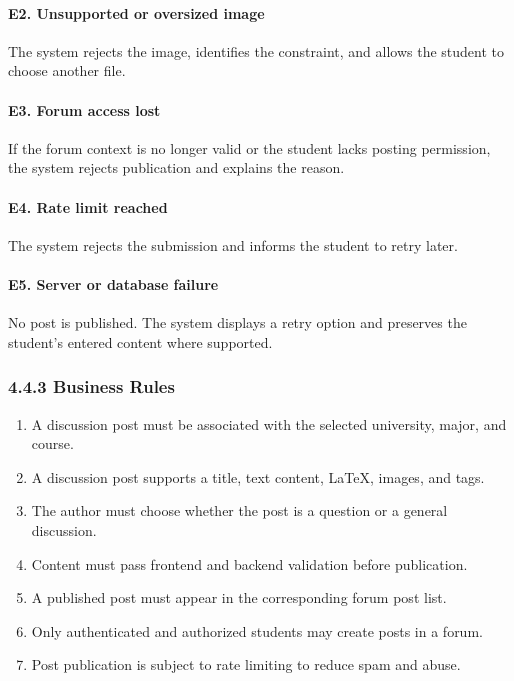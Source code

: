 \documentclass[12pt]{article}
\begin{document}
\paragraph*{E2. Unsupported or oversized image}
\par\medskip
The system rejects the image, identifies the constraint, and allows the student to choose another file.
\par\medskip
\hypertarget{sec:e3-forum-access-lost}{}
\paragraph*{E3. Forum access lost}
\par\medskip
If the forum context is no longer valid or the student lacks posting permission, the system rejects publication and explains the reason.
\par\medskip
\hypertarget{sec:e4-rate-limit-reached}{}
\paragraph*{E4. Rate limit reached}
\par\medskip
The system rejects the submission and informs the student to retry later.
\par\medskip
\hypertarget{sec:e5-server-or-database-failure}{}
\paragraph*{E5. Server or database failure}
\par\medskip
No post is published. The system displays a retry option and preserves the student's entered content where supported.
\par\medskip
\hypertarget{sec:4-4-3-business-rules}{}
\subsubsection*{4.4.3 Business Rules}
\par\medskip
\begin{enumerate}
\item A discussion post must be associated with the selected university, major, and course.
\item A discussion post supports a title, text content, LaTeX, images, and tags.
\item The author must choose whether the post is a question or a general discussion.
\item Content must pass frontend and backend validation before publication.
\item A published post must appear in the corresponding forum post list.
\item Only authenticated and authorized students may create posts in a forum.
\item Post publication is subject to rate limiting to reduce spam and abuse.
\end{enumerate}
\par\medskip
\hypertarget{sec:4-5-special-requirements}{}
\end{document}
